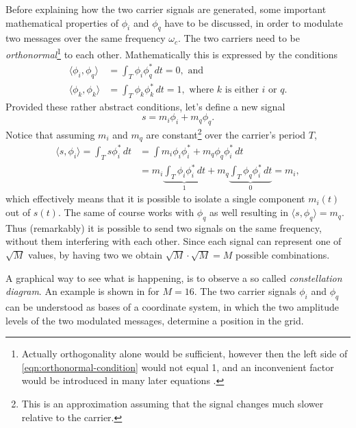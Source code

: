 Before explaining how the two carrier signals are generated, some important mathematical properties of \(\phi_i\) and \(\phi_q\) have to be discussed, in order to modulate two messages over the same frequency \(\omega_c\). The two carriers need to be \emph{orthonormal}\footnote{Actually orthogonality alone would be sufficient, however then the left side of \eqref{eqn:orthonormal-condition} would not equal 1, and an inconvenient factor would be introduced in many later equations \cite{Gallager,Hsu}.} to each other. Mathematically this is expressed by the conditions \cite{Gallager}
\begin{subequations} \label{eqn:orthonormal-conditions}
	\begin{align}
		\langle \phi_i, \phi_q \rangle
			&= \int_T \phi_i \phi_q^* \, dt
			= 0, \text{ and } \label{eqn:orthogonal-condition} \\
		\langle \phi_k, \phi_k \rangle
			&= \int_T \phi_k \phi_k^*  \,dt = 1,
			\text{ where } k \text{ is either } i \text{ or } q. \label{eqn:orthonormal-condition}
	\end{align}
\end{subequations}
Provided these rather abstract conditions, let's define a new signal 
\begin{equation}
	s = m_i\phi_i + m_q\phi_q.
\end{equation}
Notice that assuming \(m_i\) and \(m_q\) are constant\footnote{This is an approximation assuming that the signal changes much slower relative to the carrier.} over the carrier's period \(T\),
\begin{align*}
	\langle s, \phi_i \rangle = \int_T s \phi_i^* \,dt
		&= \int m_i \phi_i \phi_i^* + m_q \phi_q \phi_i^* \,dt \\
		&= m_i \underbrace{\int_T \phi_i \phi_i^* \,dt}_{1}
			+ m_q \underbrace{\int_T \phi_q \phi_i^* \,dt}_{0} = m_i,
\end{align*}
which effectively means that it is possible to isolate a single component \(m_i(t)\) out of \(s(t)\). The same of course works with \(\phi_q\) as well resulting in \(\langle s, \phi_q \rangle = m_q\). Thus (remarkably) it is possible to send two signals on the same frequency, without them interfering with each other. Since each signal can represent one of \(\sqrt{M}\) values, by having two we obtain \(\sqrt{M} \cdot \sqrt{M} = M\) possible combinations.

A graphical way to see what is happening, is to observe a so called \emph{constellation diagram}. An example is shown in  for \(M = 16\). The two carrier signals \(\phi_i\) and \(\phi_q\) can be understood as bases of a coordinate system, in which the two amplitude levels of the two modulated messages, determine a position in the grid.

